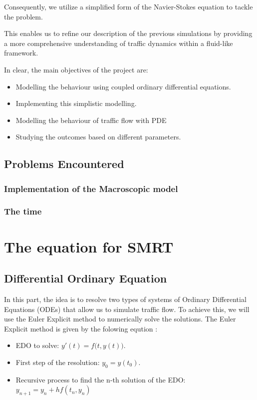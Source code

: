 \documentclass{article}
\begin{document}
	Consequently, we utilize a simplified form of the Navier-Stokes equation to tackle the problem.
	
	This enables us to refine our description of the previous simulations by providing a more comprehensive understanding of traffic dynamics within a fluid-like framework. \newline\newline
	
	In clear, the main objectives of the project are: 
	\begin{itemize}
		\item Modelling the behaviour using coupled ordinary differential equations.
		\item Implementing this simplistic modelling.
		\item Modelling the behaviour of traffic flow with PDE
		\item Studying the outcomes based on different parameters.
	\end{itemize}
	
	\subsection{Problems Encountered}
	\subsubsection{Implementation of the Macroscopic model}
	\subsubsection{The time}
	
	\section{The equation for SMRT}
		\subsection{Differential Ordinary Equation }
		In this part, the idea is to resolve two types of systems of Ordinary Differential Equations (ODEs) that allow us to simulate traffic flow. To achieve this, we will use the Euler Explicit method to numerically solve the solutions.
		The Euler Explicit method is given by the folowing eqution :
		\begin{itemize}
			\item EDO to solve: $\boxed{y'(t) = f{\bigl (}t, y(t){\bigr )}}$.
			\item First step of the resolution: $\boxed{y_0 = y(t_0)}$.
			\item Recursive process to find the n-th solution of the EDO: $\boxed{y_{n+1} = y_{n} + hf(t_{n}, y_{n})}$
		\end{itemize}
		
\end{document}
